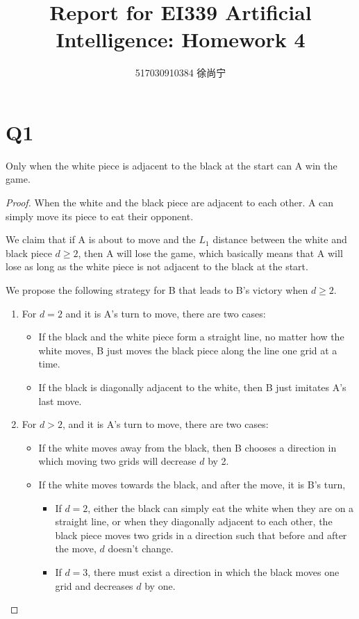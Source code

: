 \documentclass[a4paper]{article}
\title{Report for EI339 Artificial Intelligence: Homework 4}
\author{517030910384 徐尚宁}
\date{}
\begin{document}
\begin{CJK}{UTF8}{gbsn}
    \maketitle
\end{CJK}

\section*{Q1}

Only when the white piece is adjacent to the black at the start can A win the
game.

\begin{proof}
    When the white and the black piece are adjacent to each other. A can simply
    move its piece to eat their opponent.

    We claim that if A is about to move and the $L_1$ distance between the white
    and black piece $d \geq 2$, then A will lose the game, which basically means
    that A will lose as long as the white piece is not adjacent to the black at
    the start.

    We propose the following strategy for B that leads to B's victory when $d
    \geq 2$.
    \begin{enumerate}
        \item For $d = 2$ and it is A's turn to move, there are two cases:
        \begin{itemize}
            \item If the black and the white piece form a straight line, no
            matter how the white moves, B just moves the black piece along the
            line one grid at a time.
            \item If the black is diagonally adjacent to the white, then B just
            imitates A's last move.
        \end{itemize}
        \item For $d > 2$, and it is A's turn to move, there are two cases:
        \begin{itemize}
            \item If the white moves away from the black, then B chooses a
            direction in which moving two grids will decrease $d$ by 2.
            \item If the white moves towards the black, and after the move, it
            is B's turn,
            \begin{itemize}
                \item If $d = 2$, either the black can simply eat the white when
                they are on a straight line, or when they diagonally adjacent to
                each other, the black piece moves two grids in a direction such
                that before and after the move, $d$ doesn't change.
                \item If $d = 3$, there must exist a direction in which the
                black moves one grid and decreases $d$ by one.
            \end{itemize}
        \end{itemize}
    \end{enumerate}


\end{proof}
\end{document}
